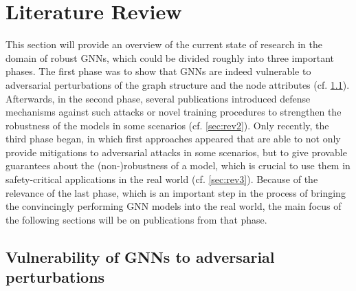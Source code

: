 \documentclass[a4paper,preprint]{sig-alternate}
\begin{document}
\section{Literature Review}
\label{sec:literature}

This section will provide an overview of the current state of research in the domain of robust GNNs, which could be divided
roughly into three important phases.
The first phase was to show that GNNs are indeed vulnerable to adversarial perturbations of the graph structure and the node attributes (cf. \ref{sec:rev1}).
Afterwards, in the second phase, several publications introduced defense mechanisms against such attacks or novel training procedures 
to strengthen the robustness of the models in some scenarios (cf. \ref{sec:rev2}). Only recently, the third phase began, in which first approaches appeared
that are able to not only provide mitigations to adversarial attacks in some scenarios, but to give provable guarantees about the (non-)robustness 
of a model, which is crucial to use them in safety-critical applications in the real world (cf. \ref{sec:rev3}). Because of the relevance of the last phase, 
which is an important step in the process of bringing the convincingly performing GNN models into the real world, the main focus of the following sections
will be on publications from that phase.

\vfill
\pagebreak

\subsection{Vulnerability of GNNs to adversarial perturbations}
\label{sec:rev1}
\end{document}
